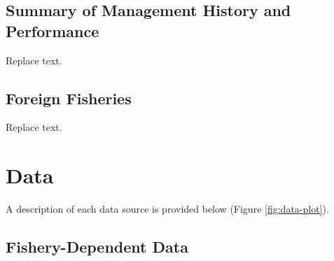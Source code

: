 \documentclass[11pt,
  english,
  a4paper,
]{article}
\begin{document}

\hypertarget{summary-of-management-history-and-performance}{%
\subsection{Summary of Management History and Performance}\label{summary-of-management-history-and-performance}}

\leavevmode\tagmcend\tagstructend


Replace text.

\leavevmode\tagmcend\tagstructend\par


\hypertarget{foreign-fisheries}{%
\subsection{Foreign Fisheries}\label{foreign-fisheries}}

\leavevmode\tagmcend\tagstructend


Replace text.

\leavevmode\tagmcend\tagstructend\par


\hypertarget{data}{%
\section{Data}\label{data}}

\leavevmode\tagmcend\tagstructend


A description of each data source is provided below (Figure \ref{fig:data-plot}).

\leavevmode\tagmcend\tagstructend\par


\hypertarget{fishery-dependent-data}{%
\subsection{Fishery-Dependent Data}\label{fishery-dependent-data}}
\end{document}
